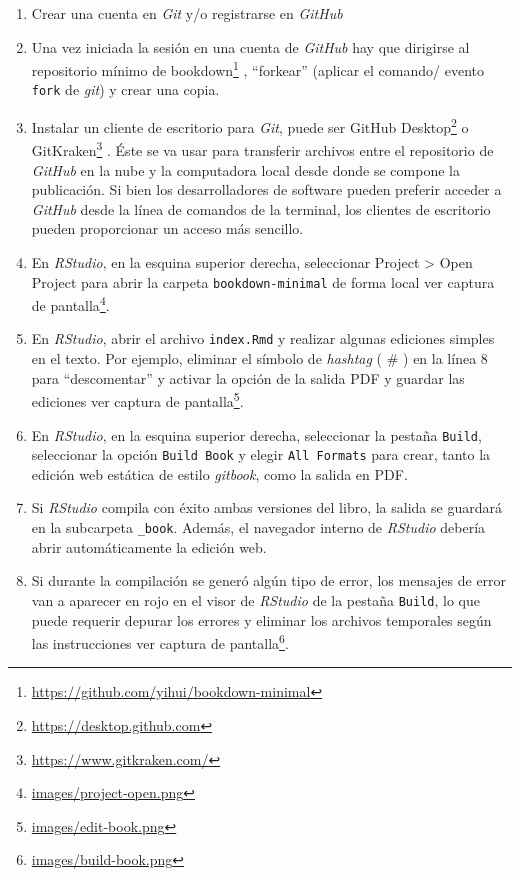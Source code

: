 \documentclass[
]{krantz}
\DeclareRobustCommand{\href}[2]{#2\footnote{\url{#1}}}
\begin{document}
\begin{enumerate}
\def\labelenumi{\arabic{enumi}.}
\item
  Crear una cuenta en \emph{Git} y/o registrarse en \emph{GitHub}
\item
  Una vez iniciada la sesión en una cuenta de \emph{GitHub} hay que dirigirse al \href{https://github.com/yihui/bookdown-minimal}{repositorio mínimo de bookdown} , ``forkear'' (aplicar el comando/ evento \texttt{fork} de \emph{git}) y crear una copia.
\item
  Instalar un cliente de escritorio para \emph{Git}, puede ser \href{https://desktop.github.com}{GitHub Desktop} o \href{https://www.gitkraken.com/}{GitKraken} . Éste se va usar para transferir archivos entre el repositorio de \emph{GitHub} en la nube y la computadora local desde donde se compone la publicación. Si bien los desarrolladores de software pueden preferir acceder a \emph{GitHub} desde la línea de comandos de la terminal, los clientes de escritorio pueden proporcionar un acceso más sencillo.
\item
  En \emph{RStudio}, en la esquina superior derecha, seleccionar Project \textgreater{} Open Project para abrir la carpeta \texttt{bookdown-minimal} de forma local \href{images/project-open.png}{ver captura de pantalla}.
\item
  En \emph{RStudio}, abrir el archivo \texttt{index.Rmd} y realizar algunas ediciones simples en el texto. Por ejemplo, eliminar el símbolo de \emph{hashtag} ( \# ) en la línea 8 para ``descomentar'' y activar la opción de la salida PDF y guardar las ediciones \href{images/edit-book.png}{ver captura de pantalla}.
\item
  En \emph{RStudio}, en la esquina superior derecha, seleccionar la pestaña \texttt{Build}, seleccionar la opción \texttt{Build\ Book} y elegir \texttt{All\ Formats} para crear, tanto la edición web estática de estilo \emph{gitbook}, como la salida en PDF.
\item
  Si \emph{RStudio} compila con éxito ambas versiones del libro, la salida se guardará en la subcarpeta \texttt{\_book}. Además, el navegador interno de \emph{RStudio} debería abrir automáticamente la edición web.
\item
  Si durante la compilación se generó algún tipo de error, los mensajes de error van a aparecer en rojo en el visor de \emph{RStudio} de la pestaña \texttt{Build}, lo que puede requerir depurar los errores y eliminar los archivos temporales según las instrucciones \href{images/build-book.png}{ver captura de pantalla}.
\end{enumerate}
\end{document}

